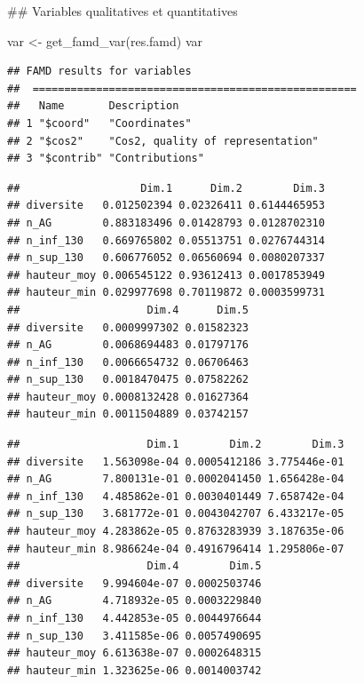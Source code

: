 \documentclass[
  12pt,
  american,
  a4paper,
  extrafontsizes,onecolumn,openright
  ]{memoir}
\newenvironment{Shaded}{\begin{snugshade}}{\end{snugshade}}
\newcommand{\CommentTok}[1]{\textcolor[rgb]{0.56,0.35,0.01}{\textit{#1}}}
\newcommand{\FunctionTok}[1]{\textcolor[rgb]{0.00,0.00,0.00}{#1}}
\newcommand{\NormalTok}[1]{#1}
\newcommand{\OtherTok}[1]{\textcolor[rgb]{0.56,0.35,0.01}{#1}}
\newcommand{\SpecialCharTok}[1]{\textcolor[rgb]{0.00,0.00,0.00}{#1}}
\begin{document}
\normalsize
\#\# Variables qualitatives et quantitatives

\scriptsize

\begin{Shaded}
\begin{Highlighting}[]
\NormalTok{var }\OtherTok{\textless{}{-}} \FunctionTok{get\_famd\_var}\NormalTok{(res.famd)}
\NormalTok{var}
\end{Highlighting}
\end{Shaded}

\begin{verbatim}
## FAMD results for variables 
##  ===================================================
##   Name       Description                      
## 1 "$coord"   "Coordinates"                    
## 2 "$cos2"    "Cos2, quality of representation"
## 3 "$contrib" "Contributions"
\end{verbatim}

\begin{Shaded}
\end{Shaded}

\begin{verbatim}
##                   Dim.1      Dim.2        Dim.3
## diversite   0.012502394 0.02326411 0.6144465953
## n_AG        0.883183496 0.01428793 0.0128702310
## n_inf_130   0.669765802 0.05513751 0.0276744314
## n_sup_130   0.606776052 0.06560694 0.0080207337
## hauteur_moy 0.006545122 0.93612413 0.0017853949
## hauteur_min 0.029977698 0.70119872 0.0003599731
##                    Dim.4      Dim.5
## diversite   0.0009997302 0.01582323
## n_AG        0.0068694483 0.01797176
## n_inf_130   0.0066654732 0.06706463
## n_sup_130   0.0018470475 0.07582262
## hauteur_moy 0.0008132428 0.01627364
## hauteur_min 0.0011504889 0.03742157
\end{verbatim}

\begin{Shaded}
\end{Shaded}

\begin{verbatim}
##                    Dim.1        Dim.2        Dim.3
## diversite   1.563098e-04 0.0005412186 3.775446e-01
## n_AG        7.800131e-01 0.0002041450 1.656428e-04
## n_inf_130   4.485862e-01 0.0030401449 7.658742e-04
## n_sup_130   3.681772e-01 0.0043042707 6.433217e-05
## hauteur_moy 4.283862e-05 0.8763283939 3.187635e-06
## hauteur_min 8.986624e-04 0.4916796414 1.295806e-07
##                    Dim.4        Dim.5
## diversite   9.994604e-07 0.0002503746
## n_AG        4.718932e-05 0.0003229840
## n_inf_130   4.442853e-05 0.0044976644
## n_sup_130   3.411585e-06 0.0057490695
## hauteur_moy 6.613638e-07 0.0002648315
## hauteur_min 1.323625e-06 0.0014003742
\end{verbatim}
\end{document}
